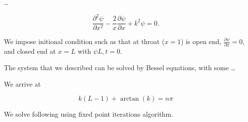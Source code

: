 \documentclass{article}
\begin{document}
\dots

\begin{equation}
    \frac{\partial^2 \psi}{\partial x^2} - \frac{2}{x} \frac{\partial \psi}{\partial x} + k^2 \psi = 0.
\end{equation}

We impose initional condition such as that at throat ($x = 1$) is open end, $\frac{\partial \psi}{\partial x} = 0$, and closed end at $x = L$ with $\psi{L, t} = 0$.

The system that we described can be solved by Bessel equations, with some \dots

We arrive at 

\begin{equation}
    k (L - 1) + \arctan(k) = n \pi
\end{equation}

We solve following using fixed point iterations algorithm.


\end{document}
